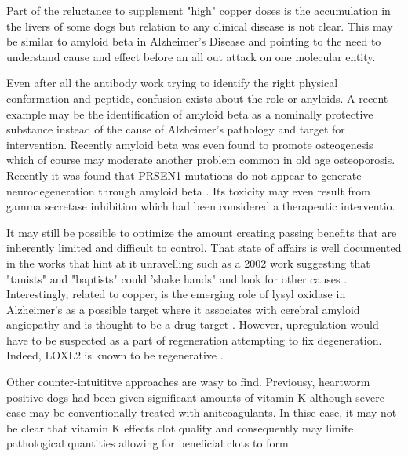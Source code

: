 {Part of the reluctance to supplement "high" copper doses
is the accumulation in the livers of some dogs but
relation to any clinical disease is not clear. This
may be similar to amyloid beta in Alzheimer's
Disease and pointing to the need to understand cause
and effect before an all out attack on one molecular
entity.  

Even after all the antibody work trying to identify
the right physical conformation and peptide,
confusion exists about the role or anyloids. 
A recent example may be the identification of amyloid
beta as a nominally protective substance
\cite{Yu_Wu_Amyloid_upbeta_double_2021}
\cite{PMID35673950}
 instead of
the cause of Alzheimer's pathology and target
for intervention. 
Recently amyloid beta was even found to promote osteogenesis
\cite{PMC11301219} which of course may moderate another problem
common in old age osteoporosis.
Recently it was found that PRSEN1 mutations do not appear
to generate neurodegeneration through amyloid beta 
\cite{PMID39136994}.
Its toxicity may even result from gamma secretase inhibition
\cite{PMC11259434} which had been considered a therapeutic interventio.

It may still be possible to optimize the amount creating
passing benefits that are inherently limited and difficult
to control. 
That state of affairs is well documented
in the works
that hint at it unravelling\cite{PMID37833948}  such as a 2002 work
suggesting that  "tauists" and "baptists" could 'shake hands"
and look for other causes \cite{PMID11801334}.
Interestingly, related to copper,
is the emerging role of lysyl oxidase in Alzheimer's
as a possible target 
where it associates with cerebral amyloid angiopathy and
is thought to be a drug target 
\cite{Kelly_Sharp_Thomas_Targeting_lysyl_oxidase_2023}
\cite{PMC11042178}. However,  upregulation would have to be
suspected as a part of regeneration attempting to fix
degeneration. 
Indeed, LOXL2 is known to be regenerative
\cite{Tashkandi_Alsaqer_Alhousami_LOXL2_promotes_aggrecan_2020}.

Other counter-intuititve approaches are wasy to find. 
Previousy, heartworm positive dogs had been given
significant amounts of vitamin K
\cite{mmarchywka-MJM-2021-003-v0.50rg}
\cite{mmarchywka-MJM-2019-001-.1li}
 although severe
case may be conventionally treated with anitcoagulants. In thise
case, it may not be clear that vitamin K effects clot
quality and consequently may limite pathological quantities
allowing for beneficial clots to form. 

} %


